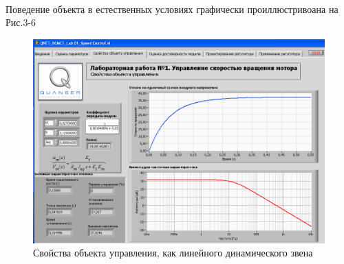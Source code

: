\documentclass[12pt]{article}
\begin{document}
\paragraph{}
Поведение объекта в естественных условиях графически проиллюстривоана на Рис.3-6
\begin{center}
	\begin{figure}[h]
		\centering
		\includegraphics[scale=1.6]{response}
		\caption{Свойства объекта управления, как линейного динамического звена}
	\end{figure}
\end{center}
\end{document}

